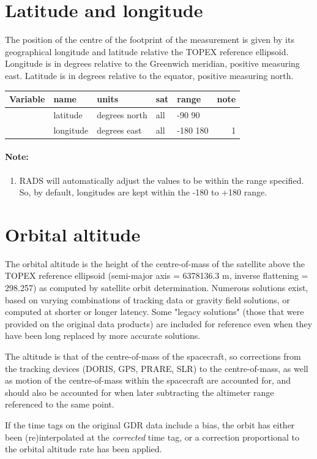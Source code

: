 \documentclass[a4paper,11pt,openany,natbib,nomargin]{thesis}
\newenvironment{vartable}{
\begin{table}[ht]
\small
\begin{tabular}{lllllr}
\hline\hline
Variable & name & units & sat & range & note \\
\hline\hline
}{
\hline
\end{tabular}
\end{table}
}
\newenvironment{notes}[1][Notes:]{\FloatBarrier\paragraph{#1}\begin{enumerate}}{\end{enumerate}}
\begin{document}
\section{Latitude and longitude}
The position of the centre of the footprint of the measurement is given by its geographical longitude and latitude relative the TOPEX reference ellipsoid. Longitude is in degrees relative to the Greenwich meridian, positive measuring east. Latitude is in degrees relative to the equator, positive measuring north.

\begin{vartable}
\var{lat} & latitude & degrees north & all & -90 90 & \\
\var{lon} & longitude & degrees east & all & -180 180 & 1 \\
\end{vartable}

\begin{notes}[Note:]
\item RADS will automatically adjust the values to be within the range specified. So, by default, longitudes are kept within the -180 to +180 range.
\end{notes}

\section{Orbital altitude}\label{var:alt}
The orbital altitude is the height of the centre-of-mass of the satellite above the TOPEX reference ellipsoid (semi-major axis = 6378136.3 m, inverse flattening = 298.257) as computed by satellite orbit determination. Numerous solutions exist, based on varying combinations of tracking data or gravity field solutions, or computed at shorter or longer latency. Some "legacy solutions" (those that were provided on the original data products) are included for reference even when they have been long replaced by more accurate solutions.

The altitude is that of the centre-of-mass of the spacecraft, so corrections from the tracking devices (DORIS, GPS, PRARE, SLR) to the centre-of-mass, as well as motion of the centre-of-mass within the spacecraft are accounted for, and should also be accounted for when later subtracting the altimeter range referenced to the same point.

If the time tags on the original GDR data include a bias, the orbit has either been (re)interpolated at the \emph{corrected} time tag, or a correction proportional to the orbital altitude rate has been applied.
\end{document}
